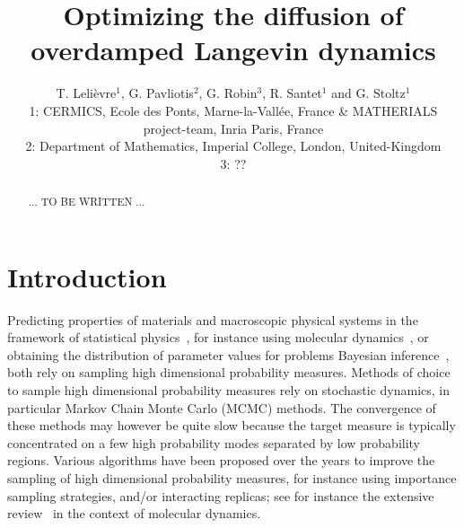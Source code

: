 \documentclass{article}
\begin{document}
\title{Optimizing the diffusion of overdamped Langevin dynamics}
\author{T. Leli\`evre$^{1}$, G. Pavliotis$^2$, G. Robin$^{3}$, R. Santet$^{1}$ and G. Stoltz$^{1}$ \\
  \small 1: CERMICS, Ecole des Ponts, Marne-la-Vallée, France \& MATHERIALS project-team, Inria Paris, France \\
  \small 2: Department of Mathematics, Imperial College, London, United-Kingdom \\
  \small 3: ??
}
 
\maketitle

\begin{abstract}
... TO BE WRITTEN ...
\end{abstract}

\section{Introduction}

Predicting properties of materials and macroscopic physical systems in the framework of statistical physics~\cite{Balian}, for instance using molecular dynamics~\cite{FrenkelSmit,Tuckerman,LM15,lelievre_stoltz_2016,AT17}, or obtaining the distribution of parameter values for problems Bayesian inference~\cite{Robert07}, both rely on sampling high dimensional probability measures. Methods of choice to sample high dimensional probability measures rely on stochastic dynamics, in particular Markov Chain Monte Carlo (MCMC) methods. The convergence of these methods may however be quite slow because the target measure is typically concentrated on a few high probability modes separated by low probability regions. Various algorithms have been proposed over the years to improve the sampling of high dimensional probability measures, for instance using importance sampling strategies, and/or interacting replicas; see for instance the extensive review~\cite{HLSVD22} in the context of molecular dynamics.
\end{document}
